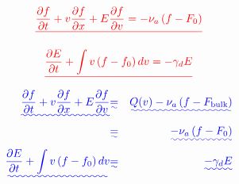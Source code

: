 \documentclass{article}
\providecommand{\DIFadd}[1]{{\protect\color{blue}\uwave{#1}}} %
\providecommand{\DIFdel}[1]{{\protect\color{red}\sout{#1}}}                      %
\providecommand{\DIFaddbegin}{} %
\providecommand{\DIFaddend}{} %
\providecommand{\DIFdelbegin}{} %
\providecommand{\DIFdelend}{} %
\begin{document}
\DIFdelbegin \[\DIFdel{
\label{MVE}
	\frac{\partial f}{\partial t} + v \frac{\partial f}{\partial x} + E \frac{\partial f}{\partial v} =
		- \nu_a \left( f - F_0 \right)
}\]

\[\DIFdel{
\label{MDCE}
	\frac{\partial E}{\partial t} + \int v \left( f - f_0 \right) dv = - \gamma_d E
}\]
\DIFdelend \DIFaddbegin \begin{eqnarray}\DIFadd{
\label{MVE2}
	\frac{\partial f}{\partial t} + v \frac{\partial f}{\partial x} + E \frac{\partial f}{\partial v} }& \DIFadd{= }&
		\DIFadd{Q(v) - \nu_a \left( f - F_{\rm bulk} \right) }\\
		& \DIFadd{= }& \DIFadd{- \nu_a \left( f - F_0 \right)         }\\
\DIFadd{\label{MDCE2}
	\frac{\partial E}{\partial t} + \int v \left( f - f_0 \right) dv }& \DIFadd{= }& \DIFadd{- \gamma_d E
}\end{eqnarray}
\DIFaddend 
\end{document}
